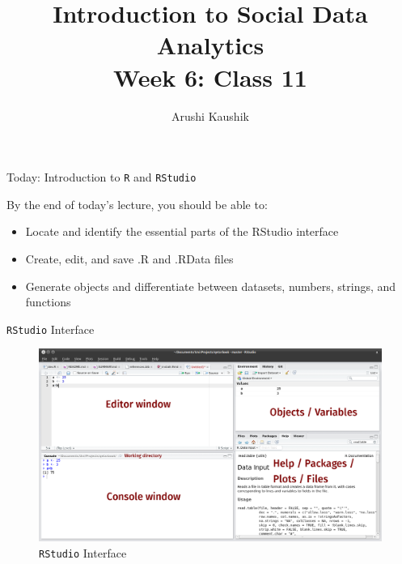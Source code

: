 \documentclass[ignorenonframetext,]{beamer}
\title[Class 11]{Introduction to Social Data Analytics\\
	Week 6: Class 11}
\author{Arushi Kaushik}
\institute[UCSD]{arkaushi@ucsd.edu}
\date[Week6]{}
\providecommand{\tightlist}{%
	\setlength{\itemsep}{0pt}\setlength{\parskip}{0pt}}
\begin{document}
\frame{\titlepage}

\begin{frame}{Today: Introduction to \texttt{R} and \texttt{RStudio}}

By the end of today's lecture, you should be able to:

\begin{itemize}
\tightlist
\item
  Locate and identify the essential parts of the RStudio interface
\item
  Create, edit, and save .R and .RData files
\item
  Generate objects and differentiate between datasets, numbers, strings,
  and functions
\end{itemize}

\end{frame}

\begin{frame}[fragile]{\texttt{RStudio} Interface}

\begin{figure}
\centering
\includegraphics{rstudio.png}
\caption{\texttt{RStudio} Interface}
\end{figure}

\end{frame}
\end{document}
